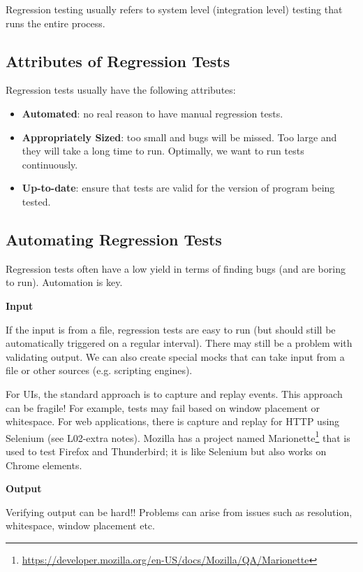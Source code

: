 \documentclass[11pt]{article}
\begin{document}
Regression testing usually refers to system level (integration level) testing that runs the entire process.

\subsection*{Attributes of Regression Tests}

Regression tests usually have the following attributes:

\begin{itemize}[noitemsep]
\item \textbf{Automated}: no real reason to have manual regression tests.
\item \textbf{Appropriately Sized}: too small and bugs will be missed. Too large and they will take a long time to run. Optimally, we want to run tests continuously.
\item \textbf{Up-to-date}: ensure that tests are valid for the version of program being tested.

\end{itemize}

\subsection*{Automating Regression Tests}

Regression tests often have a low yield in terms of finding bugs (and are boring to run). Automation is key.

\textbf{Input}

If the input is from a file, regression tests are easy to run (but should still be automatically triggered on a regular interval). There may still be a problem with validating output. We can also create special mocks that can take input from a file or other sources (e.g. scripting engines). 

For UIs, the standard approach is to capture and replay events. This approach can be fragile! For example, tests may fail based on window placement or whitespace. For web applications, there is capture and replay for HTTP using Selenium (see L02-extra notes). Mozilla has a project named Marionette\footnote{\url{https://developer.mozilla.org/en-US/docs/Mozilla/QA/Marionette}} that is used to test Firefox and Thunderbird; it is like Selenium but also works on Chrome elements. 

\textbf{Output}

Verifying output can be hard!! Problems can arise from issues such as resolution, whitespace, window placement etc. 
\end{document}

